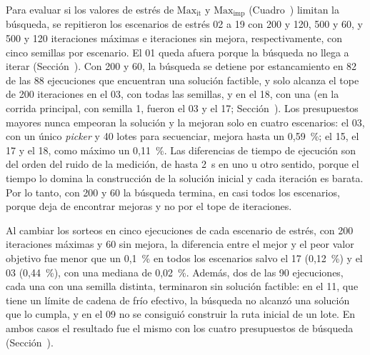 Para evaluar si los valores de estrés de $\text{Max}_{\text{it}}$ y
$\text{Max}_{\text{imp}}$ (Cuadro~) limitan la
búsqueda, se repitieron los escenarios de estrés 02 a 19 con 200 y 120, 500
y 60, y 500 y 120 iteraciones máximas e iteraciones sin mejora,
respectivamente, con cinco semillas por escenario. El 01 queda afuera porque
la búsqueda no llega a iterar (Sección~). Con 200 y
60, la búsqueda se detiene por estancamiento en 82 de las 88 ejecuciones que
encuentran una solución factible, y solo alcanza el tope de 200 iteraciones
en el 03, con todas las semillas, y en el 18, con una (en la corrida
principal, con semilla 1, fueron el 03 y el 17;
Sección~). Los presupuestos
mayores nunca empeoran la solución y la mejoran solo en cuatro escenarios:
el 03, con un único {\em picker} y 40 lotes para secuenciar, mejora hasta un
0,59~\%; el 15, el 17 y el 18, como máximo un 0,11~\%. Las diferencias de
tiempo de ejecución son del orden del ruido de la medición, de hasta 2~s en
uno u otro sentido, porque el tiempo lo domina la construcción de la
solución inicial y cada iteración es barata. Por lo tanto, con 200 y 60 la
búsqueda termina, en casi todos los escenarios, porque deja de encontrar
mejoras y no por el tope de iteraciones.

\stopsubsection

\startsubsection[title={Variación entre semillas}, reference=sec:calib_hc_semillas]

Al cambiar los sorteos en cinco ejecuciones de cada escenario de estrés, con
200 iteraciones máximas y 60 sin mejora, la diferencia entre el mejor y el
peor valor objetivo fue menor que un 0,1~\% en todos los escenarios salvo el
17 (0,12~\%) y el 03 (0,44~\%), con una mediana de 0,02~\%. Además, dos de las 90 ejecuciones, cada una con una semilla distinta,
terminaron sin solución factible: en
el 11, que tiene un límite de cadena de frío efectivo, la búsqueda no
alcanzó una solución que lo cumpla, y en el 09 no se consiguió construir la
ruta inicial de un lote. En ambos casos el resultado fue el mismo con los
cuatro presupuestos de búsqueda (Sección~).

\stopsubsection

\stopsection

\startsection[title={Calibración de Ant Colony Optimization}, reference=sec:calib_aco]

